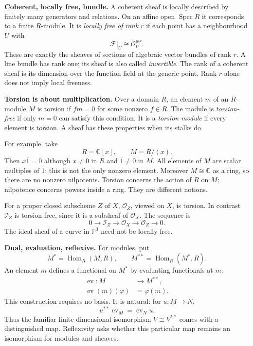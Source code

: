 \medskip\noindent

\textbf{Coherent, locally free, bundle.}
A coherent sheaf is locally described by
finitely many generators and relations.
On an affine open $\operatorname{Spec}R$
it corresponds to a finite $R$-module.
It is \emph{locally free of rank $r$} if
each point has a neighbourhood $U$ with
$$
\mathcal{F}|_U\cong\mathcal{O}_U^{\oplus r}.
$$
These are exactly the sheaves of sections
of algebraic vector bundles of rank $r$.
A line bundle has rank one; its sheaf is
also called \emph{invertible}.
The rank of a coherent sheaf is its
dimension over the function field at the
generic point. Rank $r$ alone does not
imply local freeness.

\medskip\noindent
\textbf{Torsion is about multiplication.}
Over a domain $R$, an element $m$ of an
$R$-module $M$ is torsion if $fm=0$ for
some nonzero $f\in R$.
The module is \emph{torsion-free} if
only $m=0$ can satisfy this condition.
It is a \emph{torsion module} if every
element is torsion. A sheaf has these
properties when its stalks do.

For example, take
$$
R=\mathbb{C}[x],\qquad M=R/(x).
$$
Then $x\overline{1}=0$ although
$x\ne0$ in $R$ and $\overline{1}\ne0$
in $M$. All elements of $M$ are scalar
multiples of $\overline{1}$; this is not
the only nonzero element.
Moreover $M\cong\mathbb{C}$ as a ring,
so there are no nonzero nilpotents.
Torsion concerns the action of $R$ on
$M$; nilpotence concerns powers inside
a ring. They are different notions.

For a proper closed subscheme $Z$ of $X$,
$\mathcal{O}_Z$, viewed on $X$, is torsion.
In contrast $\mathcal{I}_Z$ is
torsion-free, since it is a subsheaf of
$\mathcal{O}_X$. The sequence is
$$
0\longrightarrow\mathcal{I}_Z
\longrightarrow\mathcal{O}_X
\longrightarrow\mathcal{O}_Z
\longrightarrow0.
$$
The ideal sheaf of a curve in
$\mathbb{P}^3$ need not be locally free.

\medskip\noindent
\textbf{Dual, evaluation, reflexive.}
For modules, put
$$
M^*=\operatorname{Hom}_R(M,R),\qquad
M^{**}=\operatorname{Hom}_R(M^*,R).
$$
An element $m$ defines a functional on
$M^*$ by evaluating functionals at $m$:
$$
\begin{aligned}
\operatorname{ev}:M&\longrightarrow M^{**},\\
\operatorname{ev}(m)(\varphi)&=\varphi(m).
\end{aligned}
$$
This construction requires no basis.
It is natural: for $u:M\to N$,
$$
u^{**}\operatorname{ev}_M
=\operatorname{ev}_N u.
$$
Thus the familiar finite-dimensional
isomorphism $V\cong V^{**}$ comes with
a distinguished map. Reflexivity asks
whether this particular map remains an
isomorphism for modules and sheaves.

